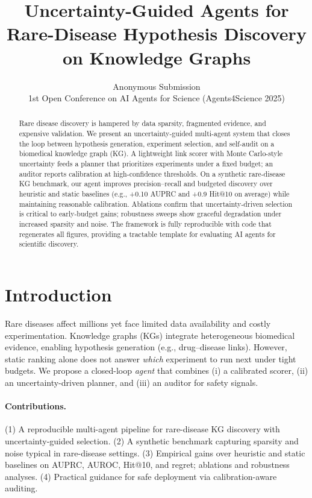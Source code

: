 \documentclass{article}
\title{Uncertainty-Guided Agents for Rare-Disease Hypothesis Discovery on Knowledge Graphs}
\author{Anonymous Submission \\ 1st Open Conference on AI Agents for Science (Agents4Science 2025)}
\date{}
\begin{document}
\maketitle

\begin{abstract}
Rare disease discovery is hampered by data sparsity, fragmented evidence, and expensive validation. We present an uncertainty-guided multi-agent system that closes the loop between hypothesis generation, experiment selection, and self-audit on a biomedical knowledge graph (KG). A lightweight link scorer with Monte Carlo-style uncertainty feeds a planner that prioritizes experiments under a fixed budget; an auditor reports calibration at high-confidence thresholds. On a synthetic rare-disease KG benchmark, our agent improves precision--recall and budgeted discovery over heuristic and static baselines (e.g., +\SI{0.10}{} AUPRC and +\SI{0.9}{} Hit@10 on average) while maintaining reasonable calibration. Ablations confirm that uncertainty-driven selection is critical to early-budget gains; robustness sweeps show graceful degradation under increased sparsity and noise. The framework is fully reproducible with code that regenerates all figures, providing a tractable template for evaluating AI agents for scientific discovery.
\end{abstract}

\section{Introduction}
Rare diseases affect millions yet face limited data availability and costly experimentation. Knowledge graphs (KGs) integrate heterogeneous biomedical evidence, enabling hypothesis generation (e.g., drug--disease links). However, static ranking alone does not answer \emph{which} experiment to run next under tight budgets. We propose a closed-loop \emph{agent} that combines (i) a calibrated scorer, (ii) an uncertainty-driven planner, and (iii) an auditor for safety signals.

\paragraph{Contributions.} (1) A reproducible multi-agent pipeline for rare-disease KG discovery with uncertainty-guided selection. (2) A synthetic benchmark capturing sparsity and noise typical in rare-disease settings. (3) Empirical gains over heuristic and static baselines on AUPRC, AUROC, Hit@10, and regret; ablations and robustness analyses. (4) Practical guidance for safe deployment via calibration-aware auditing.
\end{document}
